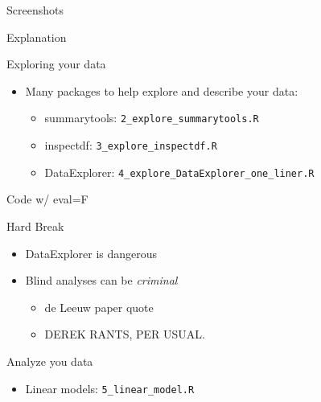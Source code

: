\documentclass[
  ignorenonframetext,
]{beamer}
\providecommand{\tightlist}{%
  \setlength{\itemsep}{0pt}\setlength{\parskip}{0pt}}
\begin{document}
\begin{frame}{Screenshots}
\protect\hypertarget{screenshots}{}

Explanation

\end{frame}

\begin{frame}[fragile]{Exploring your data}
\protect\hypertarget{exploring-your-data}{}

\begin{itemize}
\tightlist
\item
  Many packages to help explore and describe your data:

  \begin{itemize}
  \tightlist
  \item
    summarytools: \texttt{2\_explore\_summarytools.R}
  \item
    inspectdf: \texttt{3\_explore\_inspectdf.R}
  \item
    DataExplorer: \texttt{4\_explore\_DataExplorer\_one\_liner.R}
  \end{itemize}
\end{itemize}

\end{frame}

\begin{frame}{Code w/ eval=F}
\protect\hypertarget{code-w-evalf}{}

\end{frame}

\begin{frame}{Hard Break}
\protect\hypertarget{hard-break}{}

\begin{itemize}
\tightlist
\item
  DataExplorer is dangerous
\item
  Blind analyses can be \emph{criminal}

  \begin{itemize}
  \tightlist
  \item
    de Leeuw paper quote
  \item
    DEREK RANTS, PER USUAL.
  \end{itemize}
\end{itemize}

\end{frame}

\begin{frame}[fragile]{Analyze you data}
\protect\hypertarget{analyze-you-data}{}

\begin{itemize}
\tightlist
\item
  Linear models: \texttt{5\_linear\_model.R}
\end{itemize}

\end{frame}
\end{document}
